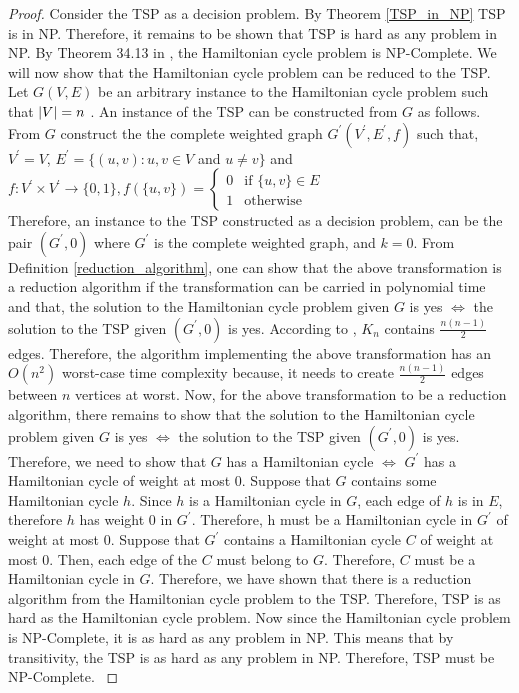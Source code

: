 \documentclass{article}
\begin{document}
\begin{proof}
Consider the TSP as a decision problem. By Theorem \ref{TSP_in_NP} TSP is in NP. Therefore, it remains to be shown that TSP is hard as any problem in NP. By Theorem 34.13 in \cite{cormen_leiserson_rivest_stein}, the Hamiltonian cycle problem is NP-Complete. We will now show that the Hamiltonian cycle problem can be reduced to the TSP. Let $G(V,E)$ be an arbitrary instance to the Hamiltonian cycle problem such that $\abs{V} = n$ . An instance of the TSP can be constructed from $G$ as follows. From $G$ construct the the complete weighted graph $G^\prime(V^\prime,E^\prime,f)$ such that, $V^\prime=V$, $E^\prime=\{(u, v) : u, v \in V$ and $u \neq v\}$ and \\
$f\colon V^\prime \times V^\prime \to \{0,1\}, f(\{u, v\}) = \begin{cases} 0& \text{if } \{u, v\} \in E\\ 1              & \text{otherwise} \end{cases}$\\
Therefore, an instance to the TSP constructed as a decision problem, can be the pair $(G^\prime,0)$ where $G^\prime$ is the complete weighted graph, and $k =0$. From Definition \ref{reduction_algorithm}, one can show that the above transformation is a reduction algorithm if the transformation can be carried in polynomial time and that, the solution to the Hamiltonian cycle problem given $G$ is yes $\iff$ the solution to the TSP given $(G^\prime,0)$ is yes. According to \cite{ray_2013}, $K_n$ contains $\frac{n(n-1)}{2}$ edges. Therefore, the algorithm implementing the above transformation has an $O(n^2)$ worst-case time complexity because, it needs to create $\frac{n(n-1)}{2}$ edges between $n$ vertices at worst. Now, for the above transformation to be a reduction algorithm, there remains to show that the solution to the Hamiltonian cycle problem given $G$ is yes $\iff$ the solution to the TSP given $(G^\prime,0)$ is yes. Therefore, we need to show that $G$ has a Hamiltonian cycle $\iff$ $G^\prime$ has a Hamiltonian cycle of weight at most 0. Suppose that $G$ contains some Hamiltonian cycle $h$. Since $h$ is a Hamiltonian cycle in $G$, each edge of $h$ is in $E$, therefore $h$ has weight 0 in $G^\prime$. Therefore, h must be a Hamiltonian cycle in $G^\prime$ of weight at most 0. Suppose that $G^\prime$ contains a Hamiltonian cycle $C$ of weight at most 0. Then, each edge of the $C$ must belong to $G$. Therefore, $C$ must be a Hamiltonian cycle in $G$. Therefore, we have shown that there is a reduction algorithm from the Hamiltonian cycle problem to the TSP. Therefore, TSP is as hard as the Hamiltonian cycle problem. Now since the Hamiltonian cycle problem is NP-Complete, it is as hard as any problem in NP. This means that by transitivity, the TSP is as hard as any problem in NP. Therefore, TSP must be NP-Complete. \cite{cormen_leiserson_rivest_stein}
\end{proof}
\end{document}
